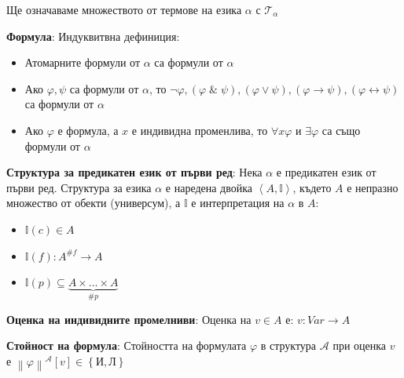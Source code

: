 \documentclass{article}
\renewcommand{\\}{\newline}
\newcommand{\amp}{\;\&\;}
\newcommand{\I}{\text{И}}
\newcommand{\lu}{\text{Л}}
\begin{document}
Ще означаваме множеството от термове на езика \(\alpha\)  с \(\mathcal{T}_{\alpha}\)

\textbf{Формула}: Индуквитвна дефиниция:\begin{itemize}
    \item Атомарните формули от \(\alpha\) са формули от \(\alpha\) 
    \item Ако \(\varphi, \psi\) са формули от \(\alpha\), то \(\lnot \varphi, (\varphi \amp \psi), (\varphi \lor \psi), (\varphi \rightarrow \psi), (\varphi \leftrightarrow \psi)\) са формули от \(\alpha\) 
    \item Ако \(\varphi\) е формула, а \(x\) е индивидна променлива, то \(\forall x \varphi\) и \(\exists \varphi\) са също формули от \(\alpha\)      
\end{itemize}  

\textbf{Структура за предикатен език от първи ред}: Нека \(\alpha\) е предикатен език от първи ред. Структура за езика \(\alpha\) е наредена двойка \(\left\langle A, \mathbb{I}\right\rangle\), където \(A\) е непразно множество от обекти (универсум), а \(\mathbb{I}\) е интерпретация на \(\alpha\) в \(A\): \begin{itemize}
    \item \(\mathbb{I}(c) \in A\)  
    \item \(\mathbb{I}(f) : A^{\#f}\to A\)  
    \item \(\mathbb{I}(p) \subseteq \underbrace{A\times ... \times A}_{\#p}\)  
\end{itemize}       

\textbf{Оценка на индивидните промелниви}: Оценка на \(v \in A\) е: \(v: Var \to A\)       

\textbf{Стойност на формула}: Стойността на формулата \(\varphi\) в структура \(\mathcal{A}\)  при оценка \(v\) е \(\left\|\varphi\right\|^{\mathcal{A}}[v] \in \left\{\I, \lu\right\}\)   
\end{document}

